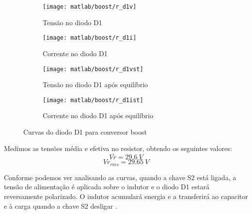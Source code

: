 \documentclass{article}
\begin{document}
\begin{figure}[H]
	\centering
	\begin{subfigure}[b]{0.4\linewidth}
		\texttt{[image: matlab/boost/r\_d1v]}
		\caption{Tensão no diodo D1}
	\end{subfigure}
	\begin{subfigure}[b]{0.4\linewidth}
		\centering
		\texttt{[image: matlab/boost/r\_d1i]}
		\caption{Corrente no diodo D1}
	\end{subfigure}
		\begin{subfigure}[b]{0.4\linewidth}
			\texttt{[image: matlab/boost/r\_d1vst]}
			\caption{Tensão no diodo D1 após equilíbrio}
		\end{subfigure}
		\begin{subfigure}[b]{0.4\linewidth}
			\centering
			\texttt{[image: matlab/boost/r\_d1ist]}
			\caption{Corrente no diodo D1 após equilíbrio}
		\end{subfigure}
	\caption{Curvas do diodo D1 para conversor boost}
	\label{fig:bod1}
\end{figure}

Medimos as tensões média e efetiva no resistor, obtendo os seguintes valores:
\begin{equation}
\overline{Vr} = 29.6\ V
\end{equation}
\begin{equation}
Vr_{rms} = 29.65\ V
\end{equation}

Conforme podemos ver analisando as curvas, quando a chave S2 está ligada, a tensão de alimentação é aplicada sobre o indutor e o diodo D1 estará reversamente polarizado. O indutor acumulará energia e a transferirá ao capacitor e à carga quando a chave S2 desligar \cite{bb:dcdc}.
\end{document}
